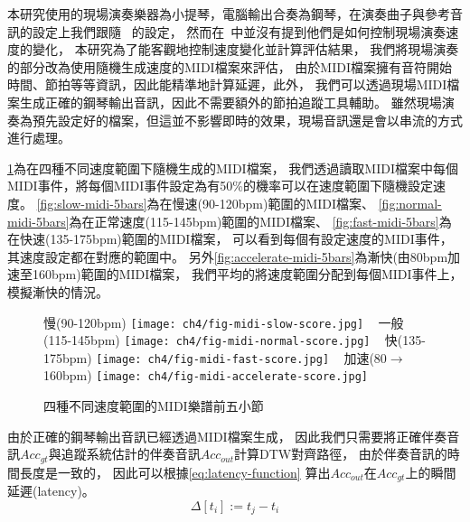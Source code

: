 \documentclass[class=NCU_thesis, crop=false]{standalone}
\begin{document}
本研究使用的現場演奏樂器為小提琴，電腦輸出合奏為鋼琴，在演奏曲子與參考音訊的設定上我們跟隨
~\cite{Lin2020AHumanComputerDuetSystem}的設定，
然而在~\cite{Lin2020AHumanComputerDuetSystem}中並沒有提到他們是如何控制現場演奏速度的變化，
本研究為了能客觀地控制速度變化並計算評估結果，
我們將現場演奏的部分改為使用隨機生成速度的MIDI檔案來評估，
由於MIDI檔案擁有音符開始時間、節拍等等資訊，因此能精準地計算延遲，此外，
我們可以透過現場MIDI檔案生成正確的鋼琴輸出音訊，因此不需要額外的節拍追蹤工具輔助。
雖然現場演奏為預先設定好的檔案，但這並不影響即時的效果，現場音訊還是會以串流的方式進行處理。

\cref{fig:different-speed-midi-score-5bars}為在四種不同速度範圍下隨機生成的MIDI檔案，
我們透過讀取MIDI檔案中每個MIDI事件，將每個MIDI事件設定為有50\%的機率可以在速度範圍下隨機設定速度。
\cref{fig:slow-midi-5bars}為在慢速(90-120bpm)範圍的MIDI檔案、
\cref{fig:normal-midi-5bars}為在正常速度(115-145bpm)範圍的MIDI檔案、
\cref{fig:fast-midi-5bars}為在快速(135-175bpm)範圍的MIDI檔案，
可以看到每個有設定速度的MIDI事件，其速度設定都在對應的範圍中。
另外\cref{fig:accelerate-midi-5bars}為漸快(由80bpm加速至160bpm)範圍的MIDI檔案，
我們平均的將速度範圍分配到每個MIDI事件上，模擬漸快的情況。

\begin{figure}[H]
    \centering
    \subcaptionbox
    {慢(90-120bpm)
    \label{fig:slow-midi-5bars}}
    {\texttt{[image: ch4/fig-midi-slow-score.jpg]}}
    ~
    \subcaptionbox
    {一般(115-145bpm)
    \label{fig:normal-midi-5bars}}
    {\texttt{[image: ch4/fig-midi-normal-score.jpg]}}
    ~
    \subcaptionbox
    {快(135-175bpm)
    \label{fig:fast-midi-5bars}}
    {\texttt{[image: ch4/fig-midi-fast-score.jpg]}}
    ~
    \subcaptionbox
    {加速(80$ \rightarrow $160bpm)
    \label{fig:accelerate-midi-5bars}}
    {\texttt{[image: ch4/fig-midi-accelerate-score.jpg]}}
    \caption{四種不同速度範圍的MIDI樂譜前五小節}
    \label{fig:different-speed-midi-score-5bars}
\end{figure}

由於正確的鋼琴輸出音訊已經透過MIDI檔案生成，
因此我們只需要將正確伴奏音訊$Acc_{gt}$與追蹤系統估計的伴奏音訊$Acc_{out}$計算DTW對齊路徑，
由於伴奏音訊的時間長度是一致的，
因此可以根據\cref{eq:latency-function}
算出$Acc_{out}$在$Acc_{gt}$上的瞬間延遲(latency)。
\begin{equation}
    \label{eq:latency-function}
    \Delta [t_i] := t_j - t_i
\end{equation}
\end{document}
